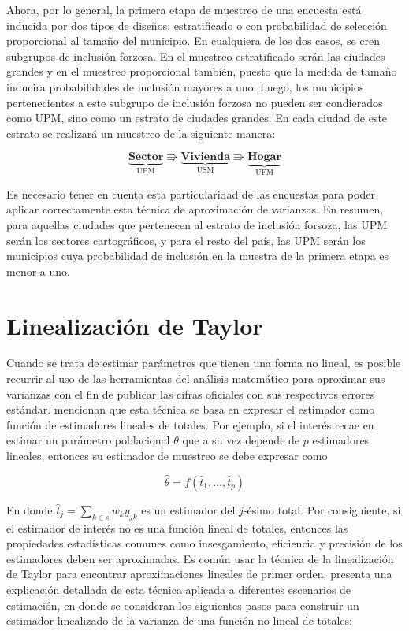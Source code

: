 \documentclass[
  10pt,
  spanish,
]{book}
\begin{document}
Ahora, por lo general, la primera etapa de muestreo de una encuesta está inducida por dos tipos de diseños: estratificado o con probabilidad de selección proporcional al tamaño del municipio. En cualquiera de los dos casos, se cren subgrupos de inclusión forzosa. En el muestreo estratificado serán las ciudades grandes y en el muestreo proporcional también, puesto que la medida de tamaño inducira probabilidades de inclusión mayores a uno.
Luego, los municipios pertenecientes a este subgrupo de inclusión forzosa no pueden ser condierados como UPM, sino como un estrato de ciudades grandes. En cada ciudad de este estrato se realizará un muestreo de la siguiente manera:

\begin{equation*}
\underbrace{\textbf{Sector}}_{\text{UPM}} \Rrightarrow
\underbrace{\textbf{Vivienda}}_{\text{USM}} \Rrightarrow
\underbrace{\textbf{Hogar}}_{\text{UFM}}
\end{equation*}

Es necesario tener en cuenta esta particularidad de las encuestas para poder aplicar correctamente esta técnica de aproximación de varianzas. En resumen, para aquellas ciudades que pertenecen al estrato de inclusión forsoza, las UPM serán los sectores cartográficos, y para el resto del país, las UPM serán los municipios cuya probabilidad de inclusión en la muestra de la primera etapa es menor a uno.

\hypertarget{linealizaciuxf3n-de-taylor}{%
\section{Linealización de Taylor}\label{linealizaciuxf3n-de-taylor}}

Cuando se trata de estimar parámetros que tienen una forma no lineal, es posible recurrir al uso de las herramientas del análisis matemático para aproximar sus varianzas con el fin de publicar las cifras oficiales con sus respectivos errores estándar. \citet{Valliant_Dever_Kreuter_2013} mencionan que esta técnica se basa en expresar el estimador como función de estimadores lineales de totales. Por ejemplo, si el interés recae en estimar un parámetro poblacional \(\theta\) que a su vez depende de \(p\) estimadores lineales, entonces su estimador de muestreo se debe expresar como

\[
\hat{\theta}=f(\hat{t}_1, \ldots, \hat{t}_p)
\]

En donde \(\hat{t}_j=\sum_{k\in s}w_k y_{jk}\) es un estimador del \(j\)-ésimo total. Por consiguiente, si el estimador de interés no es una función lineal de totales, entonces las propiedades estadísticas comunes como insesgamiento, eficiencia y precisión de los estimadores deben ser aproximadas. Es común usar la técnica de la linealización de Taylor para encontrar aproximaciones lineales de primer orden. \citet[capitulo 8]{Gutierrez_2016} presenta una explicación detallada de esta técnica aplicada a diferentes escenarios de estimación, en donde se consideran los siguientes pasos para construir un estimador linealizado de la varianza de una función no lineal de totales:
\end{document}
